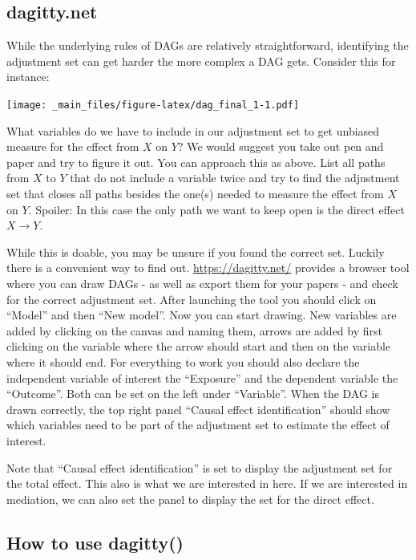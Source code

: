 \documentclass[
]{book}
\begin{document}
\hypertarget{dagitty.net}{%
\subsection{dagitty.net}\label{dagitty.net}}

While the underlying rules of DAGs are relatively straightforward, identifying
the adjustment set can get harder the more complex a DAG gets. Consider this for
instance:

\texttt{[image: \_main\_files/figure-latex/dag\_final\_1-1.pdf]}

What variables do we have to include in our adjustment set to get unbiased
measure for the effect from \(X\) on \(Y\)? We would suggest you take out pen and paper
and try to figure it out. You can approach this as above. List all paths from
\(X\) to \(Y\) that do not include a variable twice and try to find the adjustment
set that closes all paths besides the one(s) needed to measure the effect from
\(X\) on \(Y\). Spoiler: In this case the only path we want to keep open is the
direct effect \(X \rightarrow Y\).

While this is doable, you may be unsure if you found the correct set. Luckily there
is a convenient way to find out. \url{https://dagitty.net/} provides a browser tool
where you can draw DAGs - as well as export them for your papers - and check for
the correct adjustment set. After launching the tool you should click on ``Model''
and then ``New model''. Now you can start drawing. New variables are added by
clicking on the canvas and naming them, arrows are added by first clicking on
the variable where the arrow should start and then on the variable where it
should end. For everything to work you should also declare the independent
variable of interest the ``Exposure'' and the dependent variable the ``Outcome''.
Both can be set on the left under ``Variable''. When the DAG is drawn correctly,
the top right panel ``Causal effect identification'' should show which variables
need to be part of the adjustment set to estimate the effect of interest.

Note that ``Causal effect identification'' is set to display the adjustment set
for the total effect. This also is what we are interested in here. If we are
interested in mediation, we can also set the panel to display the set for the
direct effect.

\hypertarget{how-to-use-dagitty}{%
\subsection{How to use dagitty()}\label{how-to-use-dagitty}}
\end{document}
